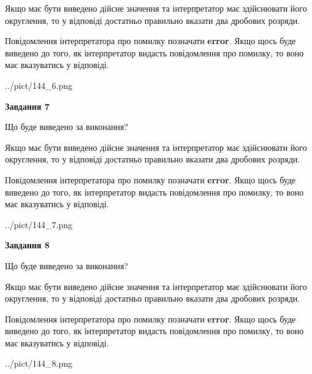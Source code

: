 \documentclass[12pt, ukrainian]{article}
\begin{document}
{\begin {Large}
Якщо має бути виведено дійсне значення та інтерпретатор має здійснювати його округлення, 
то у відповіді достатньо правильно вказати два дробових розряди.

Повідомлення інтерпретатора про помилку позначати \textbf{error}.
Якщо щось буде виведено до того, як інтерпретатор видасть повідомлення про помилку, 
то воно має вказуватись у відповіді. \par

\begin{center}
	{../pict/144_6.png}
\end{center}
\newpage

{\begin {center}\textbf{Завдання 7}\end {center}}\par
Що буде виведено за виконання? \par

Якщо має бути виведено дійсне значення та інтерпретатор має здійснювати його округлення, 
то у відповіді достатньо правильно вказати два дробових розряди.

Повідомлення інтерпретатора про помилку позначати \textbf{error}.
Якщо щось буде виведено до того, як інтерпретатор видасть повідомлення про помилку, 
то воно має вказуватись у відповіді. \par

\begin{center}
	{../pict/144_7.png}
\end{center}
\newpage

{\begin {center}\textbf{Завдання 8}\end {center}}\par
Що буде виведено за виконання? \par

Якщо має бути виведено дійсне значення та інтерпретатор має здійснювати його округлення, 
то у відповіді достатньо правильно вказати два дробових розряди.

Повідомлення інтерпретатора про помилку позначати \textbf{error}.
Якщо щось буде виведено до того, як інтерпретатор видасть повідомлення про помилку, 
то воно має вказуватись у відповіді. \par

\begin{center}
	{../pict/144_8.png}
\end{center}
\newpage


\end{Large}}
\end{document}
